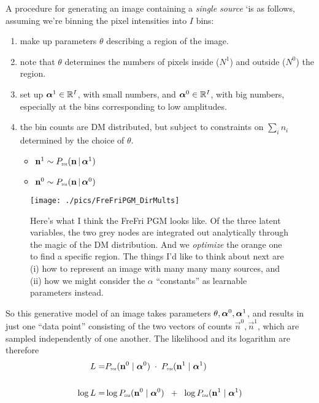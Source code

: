 \documentclass[12pt]{article}
\begin{document}
A procedure for generating an image containing a \emph{single source}
`is as follows, assuming we're binning the pixel intensities into $I$ bins:
\begin{enumerate}
\item make up parameters $\theta$ describing a region of the image.
\item note that $\theta$ determines the numbers of pixels inside ($N^1$)  and  outside ($N^0$) the region.
\item set up $\boldsymbol\alpha^1 \in \mathbb{R}^I$, with small numbers,
  and $\boldsymbol\alpha^0 \in \mathbb{R}^I$, with big numbers, especially at the bins corresponding to low amplitudes.
\item the bin counts are DM distributed, but subject to constraints on $\sum_i n_i$ determined by the choice of $\theta$.
  \begin{itemize}
    \item    $\mathbf{n}^1 \sim P_\text{\tiny\sc dm}(\mathbf{n} \,|\, \boldsymbol\alpha^1)$
    \item $\mathbf{n}^0 \sim P_\text{\tiny\sc dm}(\mathbf{n} \,|\, \boldsymbol\alpha^0)$
  \end{itemize}
\end{enumerate}


\begin{figure}
\texttt{[image: ./pics/FreFriPGM\_DirMults]}
\caption{Here's what I think the {\sc FreFri} PGM looks like. Of the three latent variables, the two grey nodes are integrated out analytically through the magic of the DM distribution. And we {\it optimize} the orange one to find a specific region. 
The things I'd like to think about next are (i) how to represent an image with many many many sources, and (ii) how we might consider the $\alpha$ ``constants'' as learnable parameters instead.
\label{fig:FreFriPGM_DirMults}
}
\end{figure}

So this generative model of an image takes parameters $\theta,
\boldsymbol\alpha^0, \boldsymbol\alpha^1$, and results in just one ``data point''
consisting of the two vectors of counts $\vec{n}^0,\vec{n}^1$, which are sampled independently of one another.  The
likelihood and its logarithm are therefore
\begin{align*}
L =& P_\text{\tiny\sc dm}(\mathbf{n}^0 \mid \boldsymbol\alpha^0) \; \cdot \; P_\text{\tiny\sc dm}(\mathbf{n}^1 \mid \boldsymbol\alpha^1) 
\\ \\
\log L =& \log P_\text{\tiny\sc dm}(\mathbf{n}^0 \mid \boldsymbol\alpha^0) \;\; + \;\; \log P_\text{\tiny\sc dm}(\mathbf{n}^1 \mid \boldsymbol\alpha^1) 
\end{align*}
\end{document}
